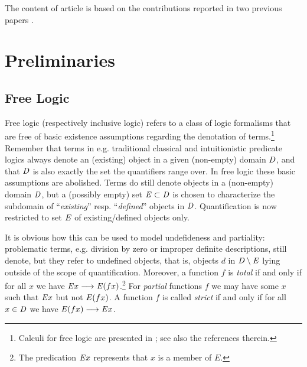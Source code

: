 The content of article is based on the 
contributions reported in two previous papers \cite{ICMS,ArXiv}.




\section{Preliminaries}
\label{sec:preliminaries}
\subsection{Free Logic}
Free logic (respectively
inclusive logic) 
\cite{Lambert60,Scott67,lambert02:_free_logic,sep-logic-free} refers to a class of logic
formalisms that are free of basic existence assumptions regarding the
denotation of terms.\footnote{Calculi for free logic are presented in \cite{sep-logic-free}; see also the references
therein.} Remember that terms in e.g. traditional classical
and intuitionistic predicate logics always denote an (existing) object
in a given (non-empty) domain $\mathit{D}$, and that $\mathit{D}$ is also exactly the set the
quantifiers range over. In free logic these
basic assumptions are abolished. Terms do still denote objects in a
(non-empty) domain $\mathit{D}$, but a (possibly empty) set $\mathit{E}\subset \mathit{D}$ is
chosen to characterize the subdomain of ``\emph{existing}'' resp. ``\emph{defined}''
objects in $\mathit{D}$. Quantification is
now restricted to set $\mathit{E}$ of existing/defined objects only. 


It is obvious how this can be used to model undefideness and
partiality: problematic terms, e.g. division by zero or improper
definite descriptions, still denote, but they refer to undefined
objects, that is, objects $d$ in $\mathit{D}\setminus \mathit{E}$ lying outside of
the scope of quantification.
Moreover, a function $f$ is \emph{total} if and only if for all $x$ we
have $\mathit{E} x \longrightarrow \mathit{E}(f x)$.\footnote{The predication $\mathit{E} x$ represents that $x$ is a
  member of $E$.}
For \emph{partial} functions $f$ we may have some $x$ such that $\mathit{E} x$ but not
$\mathit{E}(f x)$. A function $f$ is called \emph{strict}  if  and only if
for all $x\in \mathit{D}$
 we have $\mathit{E}(f x) \longrightarrow \mathit{E} x$.



